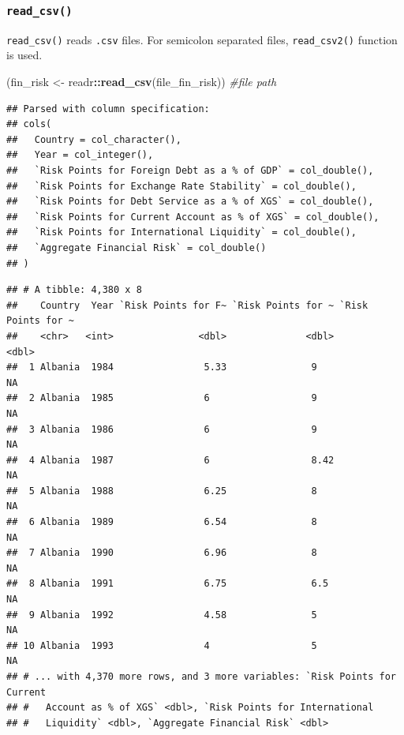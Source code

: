 \documentclass[12pt,]{article}
\newenvironment{Shaded}{\begin{snugshade}}{\end{snugshade}}
\newcommand{\KeywordTok}[1]{\textcolor[rgb]{0.13,0.29,0.53}{\textbf{#1}}}
\newcommand{\StringTok}[1]{\textcolor[rgb]{0.31,0.60,0.02}{#1}}
\newcommand{\CommentTok}[1]{\textcolor[rgb]{0.56,0.35,0.01}{\textit{#1}}}
\newcommand{\OperatorTok}[1]{\textcolor[rgb]{0.81,0.36,0.00}{\textbf{#1}}}
\newcommand{\NormalTok}[1]{#1}
\begin{document}
\subsubsection{\texorpdfstring{\texttt{read\_csv()}}{read\_csv()}}\label{read_csv}

\texttt{read\_csv()} reads \texttt{.csv} files. For semicolon separated
files, \texttt{read\_csv2()} function is used.

\begin{Shaded}
\begin{Highlighting}[]
\NormalTok{(fin_risk <-}\StringTok{ }\NormalTok{readr}\OperatorTok{::}\KeywordTok{read_csv}\NormalTok{(file_fin_risk)) }\CommentTok{#file path}
\end{Highlighting}
\end{Shaded}

\begin{verbatim}
## Parsed with column specification:
## cols(
##   Country = col_character(),
##   Year = col_integer(),
##   `Risk Points for Foreign Debt as a % of GDP` = col_double(),
##   `Risk Points for Exchange Rate Stability` = col_double(),
##   `Risk Points for Debt Service as a % of XGS` = col_double(),
##   `Risk Points for Current Account as % of XGS` = col_double(),
##   `Risk Points for International Liquidity` = col_double(),
##   `Aggregate Financial Risk` = col_double()
## )
\end{verbatim}

\begin{verbatim}
## # A tibble: 4,380 x 8
##    Country  Year `Risk Points for F~ `Risk Points for ~ `Risk Points for ~
##    <chr>   <int>               <dbl>              <dbl>              <dbl>
##  1 Albania  1984                5.33               9                    NA
##  2 Albania  1985                6                  9                    NA
##  3 Albania  1986                6                  9                    NA
##  4 Albania  1987                6                  8.42                 NA
##  5 Albania  1988                6.25               8                    NA
##  6 Albania  1989                6.54               8                    NA
##  7 Albania  1990                6.96               8                    NA
##  8 Albania  1991                6.75               6.5                  NA
##  9 Albania  1992                4.58               5                    NA
## 10 Albania  1993                4                  5                    NA
## # ... with 4,370 more rows, and 3 more variables: `Risk Points for Current
## #   Account as % of XGS` <dbl>, `Risk Points for International
## #   Liquidity` <dbl>, `Aggregate Financial Risk` <dbl>
\end{verbatim}
\end{document}
